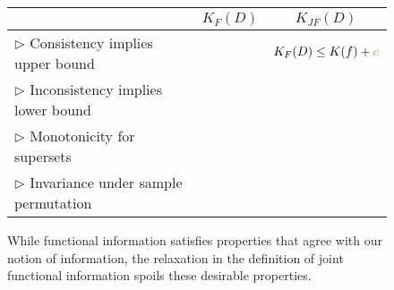 \begin{figure}[h]
	\begin{center}
	\begin{tabular}[t]{l| c| c}
		\small	
		& $K_F(D)$
		& $K_{JF}(D)$ 
		\\\hline\hline
		
		$\triangleright$ Consistency implies upper bound       
		&   \tikzcmark   
		&  \footnotesize$K_F(D)\leq K(f)+\mathcolor{Orange}{c}$       
		\\\hline                       
		
		$\triangleright$ Inconsistency implies lower bound     
		&    \tikzcmark     
		&   \tikzxmark 
		\\\hline                       
		
		$\triangleright$ Monotonicity for supersets     
		&    \tikzcmark     
		&   \tikzxmark
		\\\hline                       
		
		$\triangleright$ Invariance under sample permutation   
		&    \tikzcmark     
		&   \tikzxmark
		\\\hline 
	\end{tabular}
	\caption[Contrasting the properties of functional information and joint functional information.]{While functional information satisfies properties that agree with our notion of information, the relaxation in the definition of joint functional information spoils these desirable properties.}
	\label{fig:functional-information-vs-joint-functional-information}
	\end{center}
\end{figure}

